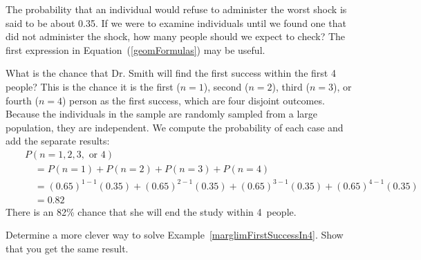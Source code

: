 \begin{exercisewrap}
\begin{nexercise}
The probability that an individual would refuse to administer the worst shock is said to be about 0.35. If we were to examine individuals until we found one that did not administer the shock, how many people should we expect to check? The first expression in Equation~(\ref{geomFormulas}) may be useful.\footnotemark
\end{nexercise}
\end{exercisewrap}

\begin{examplewrap}
\begin{nexample}{What is the chance that Dr. Smith will find the first success within the first 4 people?} \label{marglimFirstSuccessIn4}
This is the chance it is the first ($n=1$), second ($n=2$), third ($n=3$), or fourth ($n=4$) person as the first success, which are four disjoint outcomes. Because the individuals in the sample are randomly sampled from a large population, they are independent. We compute the probability of each case and add the separate results:
\begin{eqnarray*}
&&P(n=1, 2, 3,\text{ or }4) \\
	&& \quad = P(n=1)+P(n=2)+P(n=3)+P(n=4) \\
	&& \quad = (0.65)^{1-1}(0.35) + (0.65)^{2-1}(0.35) + (0.65)^{3-1}(0.35) + (0.65)^{4-1}(0.35) \\
	&& \quad = 0.82
\end{eqnarray*}
There is an 82\% chance that she will end the study within 4~people.
\end{nexample}
\end{examplewrap}

\begin{exercisewrap}
\begin{nexercise}
Determine a more clever way to solve Example~\ref{marglimFirstSuccessIn4}. Show that you get the same result.\footnotemark
\end{nexercise}
\end{exercisewrap}

